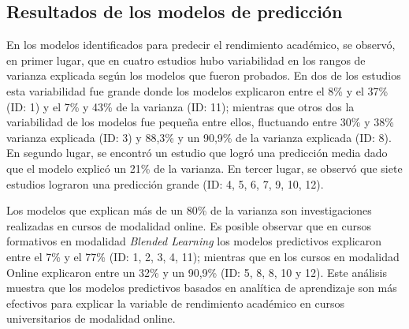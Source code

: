 \documentclass[spanish]{textolivre}
\begin{document}
\subsection*{Resultados de los modelos de predicción}
En los modelos identificados para predecir el rendimiento académico, se observó, en primer lugar, que en cuatro estudios hubo variabilidad en los rangos de varianza explicada según los modelos que fueron probados. En dos de los estudios esta variabilidad fue grande donde los modelos explicaron entre el 8\% y el 37\% (ID: 1) y el 7\% y 43\% de la varianza (ID: 11); mientras que otros dos la variabilidad de los modelos fue pequeña entre ellos, fluctuando entre 30\% y 38\% varianza explicada (ID: 3) y 88,3\% y un 90,9\% de la varianza explicada (ID: 8). En segundo lugar, se encontró un estudio que logró una predicción media dado que el modelo explicó un 21\% de la varianza. En tercer lugar, se observó que siete estudios lograron una predicción grande (ID: 4, 5, 6, 7, 9, 10, 12).

Los modelos que explican más de un 80\% de la varianza son investigaciones realizadas en cursos de modalidad online. Es posible observar que en cursos formativos en modalidad \emph{Blended Learning} los modelos predictivos explicaron entre el 7\% y el 77\% (ID: 1, 2, 3, 4, 11); mientras que en los cursos en modalidad Online explicaron entre un 32\% y un 90,9\% (ID: 5, 8, 8, 10 y 12). Este análisis muestra que los modelos predictivos basados en analítica de aprendizaje son más efectivos para explicar la variable de rendimiento académico en cursos universitarios de modalidad online.
\end{document}
